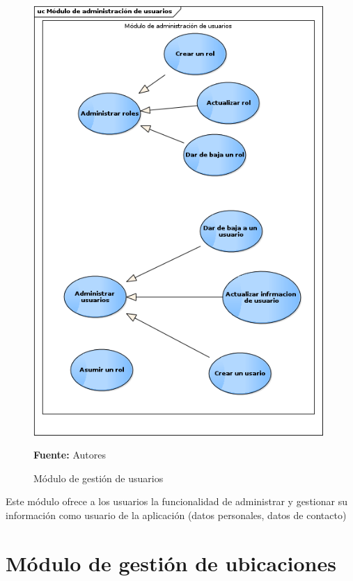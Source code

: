 \begin{figure}[!htb]
  \begin{center}
    \includegraphics[width=11cm]{./imagenes/casos_uso/gestion_usuarios.png}
    \caption{Módulo de gestión de usuarios}
    \label{fig:cu_usuarios}
    \textbf{Fuente:} Autores \\
  \end{center}
\end{figure}

Este módulo ofrece a los usuarios la funcionalidad de administrar y gestionar su información como usuario de la aplicación (datos personales, datos de contacto)

\section{Módulo de gestión de ubicaciones}

